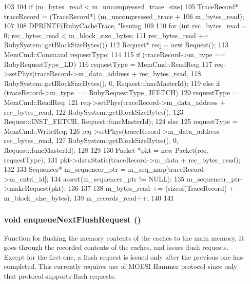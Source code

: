 \begin{DoxyCode}
103 {
104     if (m_bytes_read < m_uncompressed_trace_size) {
105         TraceRecord* traceRecord = (TraceRecord*) (m_uncompressed_trace +
106                                                                 m_bytes_read);
107 
108         DPRINTF(RubyCacheTrace, "Issuing %
109 
110         for (int rec_bytes_read = 0; rec_bytes_read < m_block_size_bytes;
111                 rec_bytes_read += RubySystem::getBlockSizeBytes()) {
112             Request* req = new Request();
113             MemCmd::Command requestType;
114 
115             if (traceRecord->m_type == RubyRequestType_LD) {
116                 requestType = MemCmd::ReadReq;
117                 req->setPhys(traceRecord->m_data_address + rec_bytes_read,
118                     RubySystem::getBlockSizeBytes(), 0, Request::funcMasterId);
119             }   else if (traceRecord->m_type == RubyRequestType_IFETCH) {
120                 requestType = MemCmd::ReadReq;
121                 req->setPhys(traceRecord->m_data_address + rec_bytes_read,
122                         RubySystem::getBlockSizeBytes(),
123                         Request::INST_FETCH, Request::funcMasterId);
124             }   else {
125                 requestType = MemCmd::WriteReq;
126                 req->setPhys(traceRecord->m_data_address + rec_bytes_read,
127                     RubySystem::getBlockSizeBytes(), 0, Request::funcMasterId);
128             }
129 
130             Packet *pkt = new Packet(req, requestType);
131             pkt->dataStatic(traceRecord->m_data + rec_bytes_read);
132 
133             Sequencer* m_sequencer_ptr = m_seq_map[traceRecord->m_cntrl_id];
134             assert(m_sequencer_ptr != NULL);
135             m_sequencer_ptr->makeRequest(pkt);
136         }
137 
138         m_bytes_read += (sizeof(TraceRecord) + m_block_size_bytes);
139         m_records_read++;
140     }
141 }
\end{DoxyCode}
\hypertarget{classCacheRecorder_a919f5c212476d98932496ef3327cf4e6}{
\subsubsection[{enqueueNextFlushRequest}]{\setlength{\rightskip}{0pt plus 5cm}void enqueueNextFlushRequest ()}}
\label{classCacheRecorder_a919f5c212476d98932496ef3327cf4e6}
Function for flushing the memory contents of the caches to the main memory. It goes through the recorded contents of the caches, and issues flush requests. Except for the first one, a flush request is issued only after the previous one has completed. This currently requires use of MOESI Hammer protocol since only that protocol supports flush requests. 


